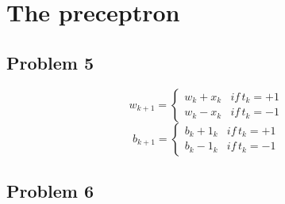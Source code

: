 \section{The preceptron}

\subsection*{Problem 5}

\[
w_{k+1}=\begin{cases}
w_{k}+x_{k} & if\, t_{k}=+1\\
w_{k}-x_{k} & if\, t_{k}=-1
\end{cases}
\]
\[
b_{k+1}=\begin{cases}
b_{k}+1_{k} & if\, t_{k}=+1\\
b_{k}-1_{k} & if\, t_{k}=-1
\end{cases}
\]

\subsection*{Problem 6}

